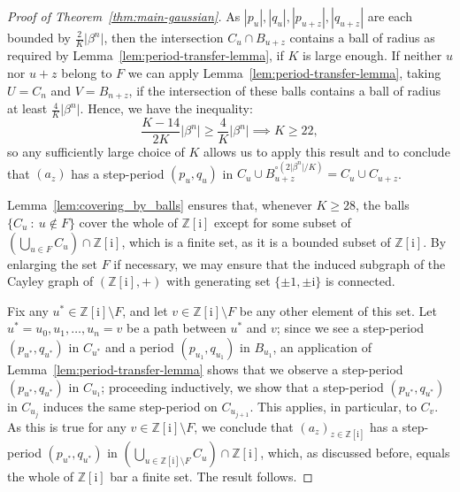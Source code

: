 \documentclass{amsart}
\newcommand{\Z}{\mathbb{Z}}
\newcommand{\ii}{\mathrm{i}}
\newtheorem*{main theorem}{Theorem \ref{thm:main-gaussian}}
\theoremstyle{definition}
\begin{document}
\begin{proof}[Proof of Theorem~\ref{thm:main-gaussian}]
As  $|p_{u}|, |q_{u}|, |p_{u+z}|, |q_{u+z}|$ are each bounded by $\frac{2}{K}\lvert\beta^n\rvert$,  
then the intersection $C_u \cap B_{u+z}$ contains a ball of radius as required by Lemma~\ref{lem:period-transfer-lemma}, if $K$ is large enough. If neither $u$ nor $u+z$ belong to $F$ we can apply Lemma~\ref{lem:period-transfer-lemma}, taking $U=C_n$ and $V=B_{n+z}$, if the intersection of these balls contains a ball of radius at least $\frac{4}{K}\lvert\beta^n\rvert$. Hence, we have the inequality:
    \[
     \frac{K-14}{2K}\lvert\beta^n\rvert 
    \ge \frac{4}{K}\lvert\beta^n\rvert\implies K\ge  22,\]
so any sufficiently large choice of $K$ allows us to apply this result and to conclude that $(a_z)$ has a step-period $(p_u,q_u)$ in $C_u\cup B_{u+z}^{\circ(2\lvert\beta^n\rvert/K)}=C_u\cup C_{u+z}$.

Lemma~\ref{lem:covering_by_balls} ensures that, whenever $K\geq 28$, the balls $\{C_u\::\: u \not\in F\} $ cover the whole of  $\Z[\ii]$ except for some subset of $\left(\bigcup_{u\in F} C_u\right)\cap\Z[\ii]$, which is a finite set, as it is a bounded subset of $\Z[\ii]$. By enlarging the set $F$ if necessary, we may ensure that the induced subgraph of the Cayley graph of $(\Z[\ii],+)$ with generating set $\{\pm1,\pm\ii\}$ is connected.


Fix any $u^*\in \Z[\ii]\setminus F$, and let $v\in\Z[\ii]\setminus F$ be any other element of this set. Let $u^*=u_0,u_1,\dotsc,u_n=v$ be a path between $u^*$ and $v$; since we see a step-period $(p_{u^*},q_{u^*})$ in $C_{u^*}$ and a period $(p_{u_1},q_{u_1})$ in $B_{u_1}$, an application of Lemma~\ref{lem:period-transfer-lemma} shows that we observe a step-period $(p_{u^*},q_{u^*})$ in $C_{u_1}$; proceeding inductively, we show that a step-period $(p_{u^*},q_{u^*})$ in $C_{u_j}$ induces the same step-period on $C_{u_{j+1}}$. This applies, in particular, to $C_v$. As this is true for any $v\in\Z[\ii]\setminus F$, we conclude that $(a_z)_{z\in\Z[\ii]}$ has a step-period $(p_{u^*},q_{u^*})$ in $\left(\bigcup_{u\in\Z[\ii]\setminus F} C_u\right)\cap\Z[\ii]$, which, as discussed before, equals the whole of $\Z[\ii]$ bar a finite set.
The result follows.
%
%
%
\end{proof}
\end{document}
